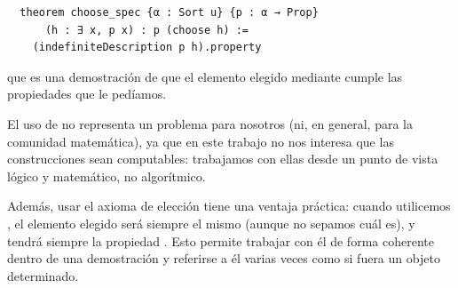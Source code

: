 \begin{lstlisting}
  theorem choose_spec {α : Sort u} {p : α → Prop}
      (h : ∃ x, p x) : p (choose h) :=
    (indefiniteDescription p h).property
\end{lstlisting}

que es una demostración de que el elemento elegido mediante  cumple las propiedades que le pedíamos.

El uso de  no representa un problema para nosotros (ni, en general, para la comunidad matemática), ya que en este trabajo no nos interesa que las construcciones sean computables: trabajamos con ellas desde un punto de vista lógico y matemático, no algorítmico.

Además, usar el axioma de elección tiene una ventaja práctica: cuando utilicemos , el elemento elegido será siempre el mismo (aunque no sepamos cuál es), y tendrá siempre la propiedad . Esto permite trabajar con él de forma coherente dentro de una demostración y referirse a él varias veces como si fuera un objeto determinado.
